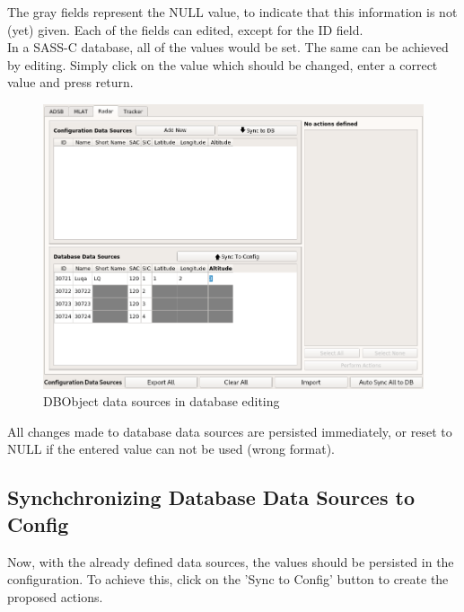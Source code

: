 The gray fields represent the NULL value, to indicate that this information is not (yet) given. Each of the fields can edited, except for the ID field. \\

In a SASS-C database, all of the values would be set. The same can be achieved by editing. Simply click on the value which should be changed, enter a correct value and press return. \\

\begin{figure}[H]
  \center
    \includegraphics[width=16cm,frame]{../screenshots/manage_data_sources_edit_ds_db2.png}
  \caption{DBObject data sources in database editing}
\end{figure}

All changes made to database data sources are persisted immediately, or reset to NULL if the entered value can not be used (wrong format).

\subsection{Synchchronizing Database Data Sources to Config}

Now, with the already defined data sources, the values should be persisted in the configuration. To achieve this, click on the 'Sync to Config' button to create the proposed actions.

